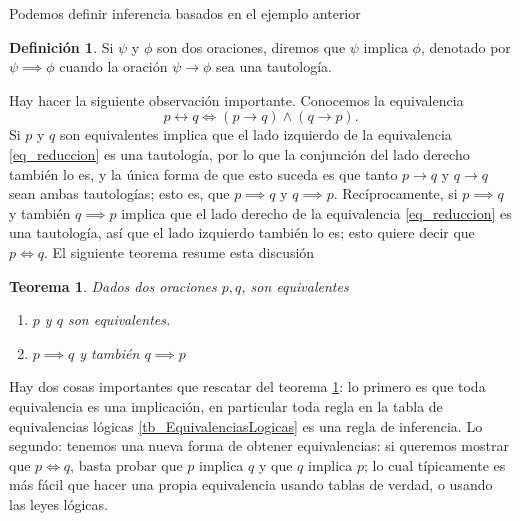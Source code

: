 \documentclass{book}
\newtheorem{thm}{Teorema}[chapter]
\theoremstyle{definition}
\newtheorem{df}{Definición}[chapter]
\begin{document}
Podemos definir inferencia basados en el ejemplo anterior
\begin{df}
	Si $\psi$ y $\phi$ son dos oraciones, diremos que $\psi$ implica $\phi$, denotado por $\psi \implies \phi$ cuando la oración $\psi \rightarrow \phi$ sea una tautología. 
\end{df}
Hay hacer la siguiente observación importante. 
Conocemos la equivalencia %
\begin{equation}\label{eq_reduccion}
	p \leftrightarrow q \iff (p \rightarrow q) \wedge (q \rightarrow p).
\end{equation}
Si $p$ y $q$ son equivalentes implica que el lado izquierdo de la equivalencia \ref{eq_reduccion} es una tautología, por lo que la conjunción del lado derecho también lo es, y la única forma de que esto suceda es que tanto $p \rightarrow q$ y $q\rightarrow q$ sean ambas tautologías; esto es, que $p\implies q$ y $q \implies p$.
Recíprocamente, si $p \implies q$ y también $q \implies p$ implica que el lado derecho de la equivalencia \ref{eq_reduccion} es una tautología, así que el lado izquierdo también lo es; esto quiere decir que $p\iff q$.
El siguiente teorema resume esta discusión
\begin{thm}\label{thm_equivalenciaEquivalencias}
	Dados dos oraciones $p,q$, son equivalentes
	\begin{enumerate}
		\item $p$ y $q$ son equivalentes.
		\item $p \implies q$ y también $q \implies p$
	\end{enumerate}
\end{thm}
Hay dos cosas importantes que rescatar del teorema \ref{thm_equivalenciaEquivalencias}:
lo primero es que toda equivalencia es una implicación, en particular toda regla en la tabla de equivalencias lógicas \ref{tb_EquivalenciasLogicas} es una regla de inferencia.
Lo segundo: tenemos una nueva forma de obtener equivalencias: si queremos mostrar que $p \iff q$, basta probar que $p$ implica $q$ y que $q$ implica $p$; lo cual típicamente es más fácil que hacer una propia equivalencia usando tablas de verdad, o usando las leyes lógicas.
\end{document}
